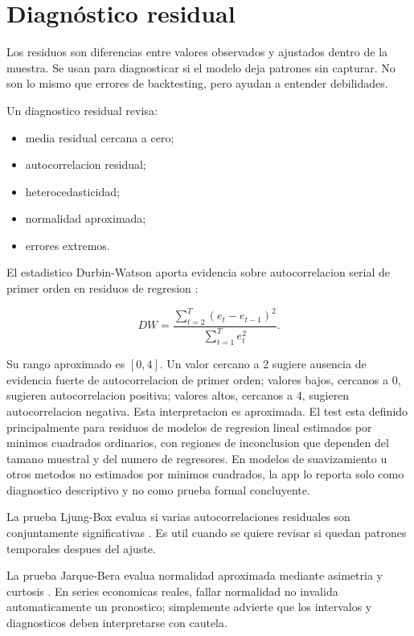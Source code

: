 ﻿\documentclass[12pt,letterpaper]{article}
\begin{document}



\section{Diagnóstico residual}

Los residuos son diferencias entre valores observados y ajustados dentro de la muestra. Se usan para diagnosticar si el modelo deja patrones sin capturar. No son lo mismo que errores de backtesting, pero ayudan a entender debilidades.

Un diagnostico residual revisa:

\begin{itemize}[leftmargin=*]
    \item media residual cercana a cero;
    \item autocorrelacion residual;
    \item heterocedasticidad;
    \item normalidad aproximada;
    \item errores extremos.
\end{itemize}

El estadistico Durbin-Watson aporta evidencia sobre autocorrelacion serial de primer orden en residuos de regresion \citep{statsmodels_durbin_watson}:

\[
DW=
\frac{\sum_{t=2}^{T}(e_t-e_{t-1})^2}
{\sum_{t=1}^{T}e_t^2}.
\]

Su rango aproximado es \([0,4]\). Un valor cercano a 2 sugiere ausencia de evidencia fuerte de autocorrelacion de primer orden; valores bajos, cercanos a 0, sugieren autocorrelacion positiva; valores altos, cercanos a 4, sugieren autocorrelacion negativa. Esta interpretacion es aproximada. El test esta definido principalmente para residuos de modelos de regresion lineal estimados por minimos cuadrados ordinarios, con regiones de inconclusion que dependen del tamano muestral y del numero de regresores. En modelos de suavizamiento u otros metodos no estimados por minimos cuadrados, la app lo reporta solo como diagnostico descriptivo y no como prueba formal concluyente.

La prueba Ljung-Box evalua si varias autocorrelaciones residuales son conjuntamente significativas \citep{statsmodels_ljungbox}. Es util cuando se quiere revisar si quedan patrones temporales despues del ajuste.

La prueba Jarque-Bera evalua normalidad aproximada mediante asimetria y curtosis \citep{statsmodels_jarque_bera}. En series economicas reales, fallar normalidad no invalida automaticamente un pronostico; simplemente advierte que los intervalos y diagnosticos deben interpretarse con cautela.
\end{document}
